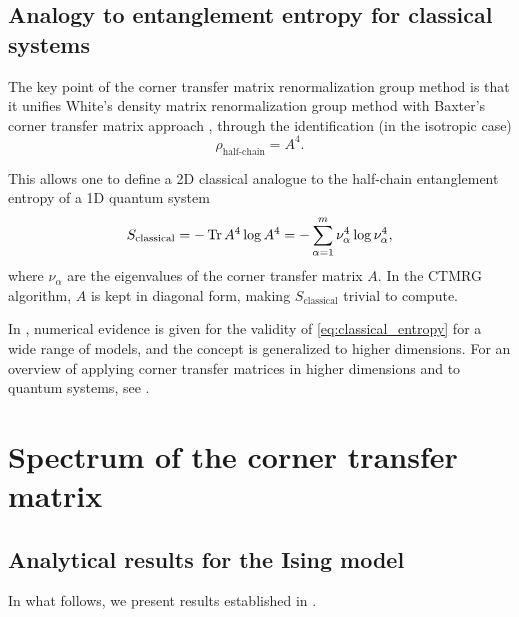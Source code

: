 \subsection{Analogy to entanglement entropy for classical systems}
The key point of the corner transfer matrix renormalization group method \cite{nishino1997corner, nishino1996corner} is
that it unifies White's density matrix renormalization group method \cite{white1992density} with Baxter's corner
transfer matrix approach \cite{baxter1968dimers, baxter1978variational}, through the identification (in the isotropic
case)
\begin{equation}\label{eq:correspondence_density_matrix_ctm}
  \rho_{\text{half-chain}} = A^4.
\end{equation}

This allows one to define a 2D classical analogue to the half-chain entanglement entropy of a 1D quantum system
\begin{equation}\label{eq:classical_entropy}
  S_{\text{classical}} = - \operatorname{Tr} A^4 \log A^4 = - \sum_{\alpha=1}^{m} \nu_{\alpha}^4 \log \nu_{\alpha}^4,
\end{equation}
where $\nu_{\alpha}$ are the eigenvalues of the corner transfer matrix $A$.
In the CTMRG algorithm, $A$ is kept in diagonal form, making $S_{\text{classical}}$ trivial to compute.

In \cite{huang2017holographic}, numerical evidence is given for the validity of \autoref{eq:classical_entropy} for a
wide range of models, and the concept is generalized to higher dimensions. For an overview of applying corner transfer
matrices in higher dimensions and to quantum systems, see \cite{orus2012exploring}.


\section{Spectrum of the corner transfer matrix}

\subsection{Analytical results for the Ising model}
In what follows, we present results established in \cite{peschel2009reduced, peschel1999density}.

